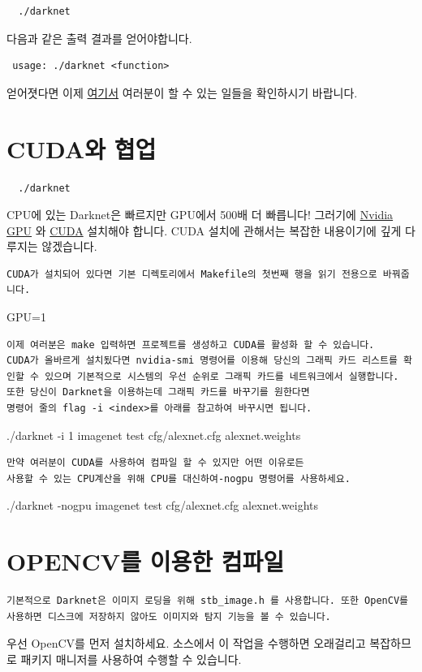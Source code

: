 \documentclass{article}
\begin{document}
\begin{verbatim}
  ./darknet 
\end{verbatim}
다음과 같은 출력 결과를 얻어야합니다.
\begin{verbatim}
 usage: ./darknet <function>

\end{verbatim}
얻어졋다면 이제 \href{https://pjreddie.com/darknet/}{여기서} 여러분이 
할 수 있는 일들을 확인하시기 바랍니다.

\section{CUDA와 협업}

\begin{verbatim}
  ./darknet 
\end{verbatim}
CPU에 있는 Darknet은 빠르지만 GPU에서 500배 더 빠릅니다! 그러기에  \href{https://developer.nvidia.com/cuda-gpus}{Nvidia GPU} 와 \href{https://developer.nvidia.com/cuda-downloads}{CUDA} 설치해야 합니다. 
CUDA 설치에 관해서는 복잡한 내용이기에 깊게 다루지는 않겠습니다.

\begin{verbatim}
CUDA가 설치되어 있다면 기본 디렉토리에서 Makefile의 첫번째 행을 읽기 전용으로 바꿔줍니다.
\end{verbatim}
 GPU=1 

\begin{verbatim}
이제 여러분은 make 입력하면 프로젝트를 생성하고 CUDA를 활성화 할 수 있습니다. 
CUDA가 올바르게 설치됬다면 nvidia-smi 명령어를 이용해 당신의 그래픽 카드 리스트를 확인할 수 있으며 기본적으로 시스템의 우선 순위로 그래픽 카드를 네트워크에서 실행합니다. 
또한 당신이 Darknet을 이용하는데 그래픽 카드를 바꾸기를 원한다면
명령어 줄의 flag -i <index>를 아래를 참고하여 바꾸시면 됩니다.
\end{verbatim}
  ./darknet -i 1 imagenet test cfg/alexnet.cfg alexnet.weights 
 
\begin{verbatim}
만약 여러분이 CUDA를 사용하여 컴파일 할 수 있지만 어떤 이유로든 
사용할 수 있는 CPU계산을 위해 CPU를 대신하여-nogpu 명령어를 사용하세요.
\end{verbatim}
   ./darknet -nogpu imagenet test cfg/alexnet.cfg alexnet.weights 

\section{OPENCV를 이용한 컴파일}

\begin{verbatim}
기본적으로 Darknet은 이미지 로딩을 위해 stb_image.h 를 사용합니다. 또한 OpenCV를 사용하면 디스크에 저장하지 않아도 이미지와 탐지 기능을 볼 수 있습니다.
\end{verbatim}
우선 OpenCV를 먼저 설치하세요.
소스에서 이 작업을 수행하면 오래걸리고 복잡하므로 패키지 매니저를 사용하여 수행할 수 있습니다.
\end{document}
